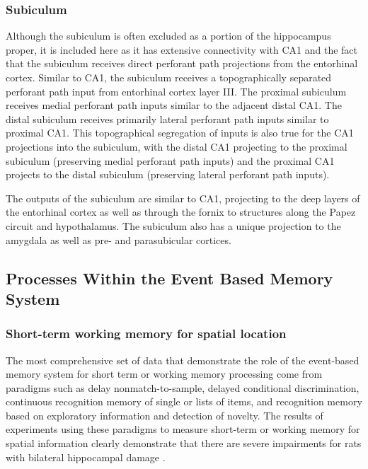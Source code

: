 \documentclass[doc, longtable]{apa6}
\begin{document}
\subsubsection{Subiculum}
Although the subiculum is often excluded as a portion of the hippocampus proper, it is included here as it has extensive connectivity with CA1 and the fact that the subiculum receives direct perforant path projections from the entorhinal cortex. Similar to CA1, the subiculum receives a topographically separated perforant path input from entorhinal cortex layer III. The proximal subiculum receives medial perforant path inputs similar to the adjacent distal CA1. The distal subiculum receives primarily lateral perforant path inputs similar to proximal CA1. This topographical segregation of inputs is also true for the CA1 projections into the subiculum, with the distal CA1 projecting to the proximal subiculum (preserving medial perforant path inputs) and the proximal CA1 projects to the distal subiculum (preserving lateral perforant path inputs). 

The outputs of the subiculum are similar to CA1, projecting to the deep layers of the entorhinal cortex as well as through the fornix to structures along the Papez circuit and hypothalamus. The subiculum also has a unique projection to the amygdala as well as pre- and parasubicular cortices.

\subsection{Processes Within the Event Based Memory System}
\subsubsection{Short-term working memory for spatial location}
The most comprehensive set of data that demonstrate the role of the event-based memory system for short term or working memory processing come from paradigms such as delay nonmatch-to-sample, delayed conditional discrimination, continuous recognition memory of single or lists of items, and recognition memory based on exploratory information and detection of novelty. The results of experiments using these paradigms to measure short-term or working memory for spatial information clearly demonstrate that there are severe impairments for rats with bilateral hippocampal damage \parencite{Kesner1990c, Olton1983a, Olton1986a, Lee2003, Kesner2011a}.
\end{document}
